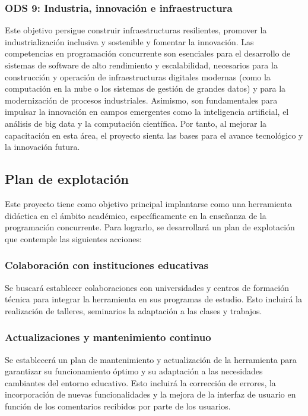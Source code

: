 \subsubsection{ODS 9: Industria, innovación e infraestructura \cite{ods_9}}
Este objetivo persigue construir infraestructuras resilientes, promover la industrialización inclusiva y sostenible y fomentar la innovación. Las competencias en programación concurrente son esenciales para el desarrollo de sistemas de software de alto rendimiento y escalabilidad, necesarios para la construcción y operación de infraestructuras digitales modernas (como la computación en la nube o los sistemas de gestión de grandes datos) y para la modernización de procesos industriales. Asimismo, son fundamentales para impulsar la innovación en campos emergentes como la inteligencia artificial, el análisis de big data y la computación científica. Por tanto, al mejorar la capacitación en esta área, el proyecto sienta las bases para el avance tecnológico y la innovación futura.

\subsection{Plan de explotación}\label{subsec:plan-explotacion}

Este proyecto tiene como objetivo principal implantarse como una herramienta didáctica en el ámbito académico, específicamente en la enseñanza de la programación concurrente. Para lograrlo, se desarrollará un plan de explotación que contemple las siguientes acciones:

\subsubsection{Colaboración con instituciones educativas}

Se buscará establecer colaboraciones con universidades y centros de formación técnica para integrar la herramienta en sus programas de estudio. Esto incluirá la realización de talleres, seminarios la adaptación a las clases y trabajos.

\subsubsection{Actualizaciones y mantenimiento continuo}

Se establecerá un plan de mantenimiento y actualización de la herramienta para garantizar su funcionamiento óptimo y su adaptación a las necesidades cambiantes del entorno educativo. Esto incluirá la corrección de errores, la incorporación de nuevas funcionalidades y la mejora de la interfaz de usuario en función de los comentarios recibidos por parte de los usuarios.

